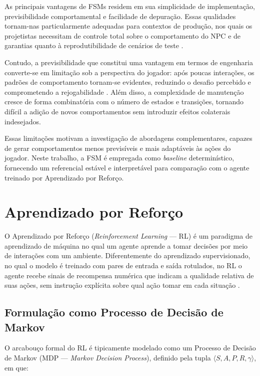 As principais vantagens de FSMs residem em sua simplicidade de implementação,
previsibilidade comportamental e facilidade de depuração. Essas qualidades
tornam-nas particularmente adequadas para contextos de produção, nos quais os
projetistas necessitam de controle total sobre o comportamento do NPC e de
garantias quanto à reprodutibilidade de cenários de teste
\cite{millington2019ai}.

Contudo, a previsibilidade que constitui uma vantagem em termos de engenharia
converte-se em limitação sob a perspectiva do jogador: após poucas interações,
os padrões de comportamento tornam-se evidentes, reduzindo o desafio percebido
e comprometendo a rejogabilidade \cite{yannakakis2018artificial}. Além disso,
a complexidade de manutenção cresce de forma combinatória com o número de
estados e transições, tornando difícil a adição de novos comportamentos sem
introduzir efeitos colaterais indesejados.

Essas limitações motivam a investigação de abordagens complementares, capazes
de gerar comportamentos menos previsíveis e mais adaptáveis às ações do
jogador. Neste trabalho, a FSM é empregada como \textit{baseline}
determinístico, fornecendo um referencial estável e interpretável para
comparação com o agente treinado por Aprendizado por Reforço.

\section{Aprendizado por Reforço}
\label{sec:aprendizado-reforco}

O Aprendizado por Reforço (\textit{Reinforcement Learning} --- RL) é um
paradigma de aprendizado de máquina no qual um agente aprende a tomar decisões
por meio de interações com um ambiente. Diferentemente do aprendizado
supervisionado, no qual o modelo é treinado com pares de entrada e saída
rotulados, no RL o agente recebe sinais de recompensa numérica que indicam a
qualidade relativa de suas ações, sem instrução explícita sobre qual ação
tomar em cada situação \cite{sutton2018reinforcement}.

\subsection{Formulação como Processo de Decisão de Markov}
\label{subsec:mdp}

O arcabouço formal do RL é tipicamente modelado como um Processo de Decisão de
Markov (MDP --- \textit{Markov Decision Process}), definido pela tupla
$\langle S, A, P, R, \gamma \rangle$, em que:

